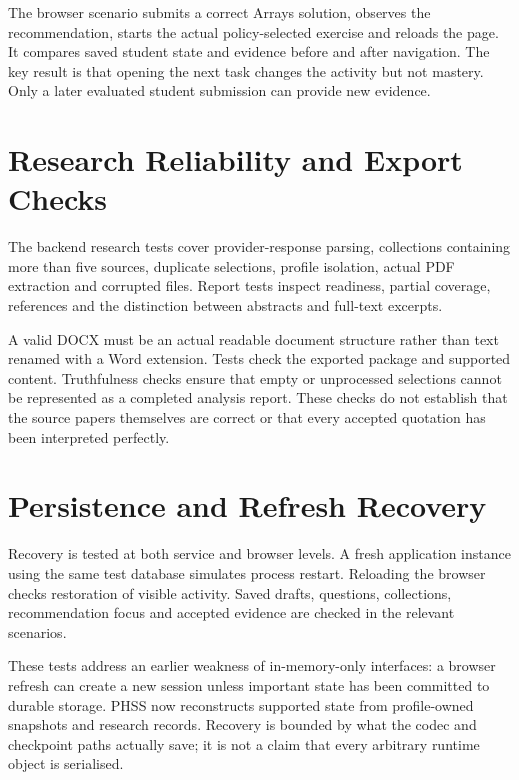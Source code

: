 The browser scenario submits a correct Arrays solution, observes the recommendation, starts the actual policy-selected exercise and reloads the page. It compares saved student state and evidence before and after navigation. The key result is that opening the next task changes the activity but not mastery. Only a later evaluated student submission can provide new evidence.

\section{Research Reliability and Export Checks}
The backend research tests cover provider-response parsing, collections containing more than five sources, duplicate selections, profile isolation, actual PDF extraction and corrupted files. Report tests inspect readiness, partial coverage, references and the distinction between abstracts and full-text excerpts.

A valid DOCX must be an actual readable document structure rather than text renamed with a Word extension. Tests check the exported package and supported content. Truthfulness checks ensure that empty or unprocessed selections cannot be represented as a completed analysis report. These checks do not establish that the source papers themselves are correct or that every accepted quotation has been interpreted perfectly.

\section{Persistence and Refresh Recovery}
Recovery is tested at both service and browser levels. A fresh application instance using the same test database simulates process restart. Reloading the browser checks restoration of visible activity. Saved drafts, questions, collections, recommendation focus and accepted evidence are checked in the relevant scenarios.

These tests address an earlier weakness of in-memory-only interfaces: a browser refresh can create a new session unless important state has been committed to durable storage. PHSS now reconstructs supported state from profile-owned snapshots and research records. Recovery is bounded by what the codec and checkpoint paths actually save; it is not a claim that every arbitrary runtime object is serialised.

